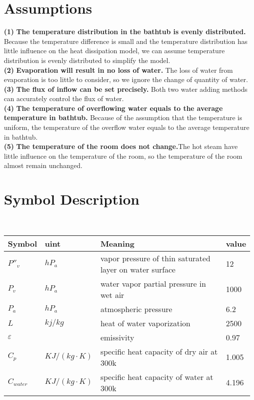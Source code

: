 \documentclass{mcmthesis}
\begin{document}
\section{Assumptions}
\noindent
{\bf (1) } \textbf{The temperature distribution in the bathtub is evenly distributed. }Because the temperature difference is small and the temperature distribution has little influence on the heat dissipation model, we can assume temperature distribution is evenly distributed to simplify the model.\\
{\bf (2) } \textbf{Evaporation will result in no loss of water.} The loss of water from evaporation is too little to consider, so we ignore the change of quantity of water.\\
{\bf (3) } \textbf{The flux of inflow can be set precisely.} Both two water adding methods can accurately control the flux of water.\\
{\bf(4) } \textbf{The temperature of overflowing water equals to the average temperature in bathtub.} Because of the assumption that the temperature is uniform, the temperature of the overflow water equals to the average temperature in bathtub.\\
{\bf(5) } \textbf{The temperature of the room does not change.}The hot steam have little influence on the temperature of the room, so the temperature of the room almost remain unchanged.


\section{Symbol Description}
\begin{table}[H]
        \setlength{\abovecaptionskip}{0pt}
        \setlength{\belowcaptionskip}{0pt}
				\\
        \begin{tabular}{p{2cm}|p{2cm}|p{7.5cm}|p{1.7cm}}
		\hline
		\rowcolor[gray]{0.9}\bf{Symbol}	&\bf{uint}      &\bf{Meaning}&\bf{value}	\\
		\hline
		${P}''_{v}$		& $hP_{a}$		 & vapor pressure of thin saturated layer on water surface  &12\\
		$P_{v}$		& $hP_{a}$		 & water vapor partial pressure in wet air &1000\\
		$P_{a}$		& $hP_{a}$		 & atmospheric pressure  &6.2\\
		$L$		& $kj/kg$		 & heat of water vaporization&2500\\
		$\varepsilon$		& 		 & emissivity&0.97\\
		$C_{p}$		& $KJ/(kg\cdot K)$		 & specific heat capacity of dry air at 300k &1.005\\
		$C_{water}$		& $KJ/(kg\cdot K)$		 & specific heat capacity of water at 300k &4.196\\

		\hline
		\end{tabular}
	\end{table}
\end{document}
